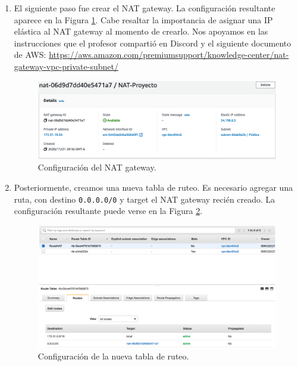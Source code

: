 \documentclass{article}
\newcommand{\ttt}[1]{%
\texttt{#1}%
}
\begin{document}
\begin{enumerate}
  \item El siguiente paso fue crear el NAT gateway.   La
    configuraci\'on resultante aparece en la Figura
    \ref{fig:NAT-nat}.  Cabe resaltar la importancia de
    asignar una IP el\'astica al NAT gateway al momento
    de crearlo. Nos apoyamos en las instrucciones que el
    profesor comparti\'o en Discord y el siguiente
    documento de AWS:
    \href{https://aws.amazon.com/premiumsupport/knowledge-center/nat-gateway-vpc-private-subnet/}{https://aws.amazon.com/premiumsupport/knowledge-center/nat-gateway-vpc-private-subnet/}
    \begin{figure}[H]
      \centering
      \includegraphics[width=\textwidth]{SSNAT/nat}
      \caption{Configuraci\'on del NAT gateway.}
      \label{fig:NAT-nat}
    \end{figure}

  \item Posteriormente, creamos una nueva tabla de
    ruteo.   Es necesario agregar una ruta, con destino
    \ttt{0.0.0.0/0} y target el NAT gateway reci\'en
    creado.   La configuraci\'on resultante puede
    verse en la Figura \ref{fig:NAT-routeTable}.
    \begin{figure}[H]
      \centering
      \includegraphics[width=\textwidth]{SSNAT/routeTable}
      \caption{Configuraci\'on de la nueva tabla de ruteo.}
      \label{fig:NAT-routeTable}
    \end{figure}


\end{enumerate}
\end{document}
